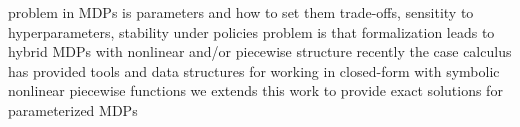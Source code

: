 
problem in MDPs is parameters and how to set them
trade-offs, sensitity to hyperparameters, stability under policies
problem is that formalization leads to hybrid MDPs with nonlinear and/or piecewise structure
recently the case calculus has provided tools and data structures for working in closed-form with symbolic nonlinear piecewise functions
we extends this work to provide exact solutions for parameterized MDPs